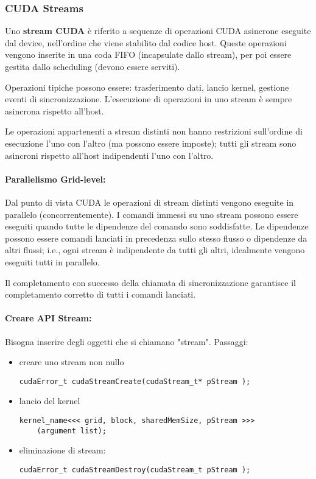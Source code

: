 \subsubsection{CUDA Streams}

Uno \textbf{stream CUDA} è riferito a sequenze di operazioni CUDA asincrone eseguite dal device, nell'ordine che viene stabilito dal codice host. Queste operazioni vengono inserite in una coda FIFO (incapsulate dallo stream), per poi essere gestita dallo scheduling (devono essere serviti). 

Operazioni tipiche possono essere: trasferimento dati, lancio kernel, gestione eventi di sincronizzazione. L'esecuzione di operazioni in uno stream è sempre asincrona rispetto all'host.

Le operazioni appartenenti a stream distinti non hanno restrizioni sull'ordine di esecuzione l'uno con l'altro (ma possono essere imposte); tutti gli stream sono asincroni rispetto all'host indipendenti l'uno con l'altro.

\paragraph{Parallelismo Grid-level:} Dal punto di vista CUDA le operazioni di stream distinti vengono eseguite in parallelo (concorrentemente). I comandi immessi su uno stream possono essere eseguiti quando tutte le dipendenze del comando sono soddisfatte. Le dipendenze possono essere comandi lanciati in precedenza sullo stesso flusso o dipendenze da altri flussi; i.e., ogni stream è indipendente da tutti gli altri, idealmente vengono eseguiti tutti in parallelo.

Il completamento con successo della chiamata di sincronizzazione garantisce il completamento corretto di tutti i comandi lanciati.

\paragraph{Creare API Stream:} Bisogna inserire degli oggetti che si chiamano "stream". Passaggi: 
\begin{itemize}
	\item creare uno stream non nullo
	\begin{verbatim}
cudaError_t cudaStreamCreate(cudaStream_t* pStream );
	\end{verbatim}
	
	\item lancio del kernel
	\begin{verbatim}
kernel_name<<< grid, block, sharedMemSize, pStream >>>
    (argument list);
	\end{verbatim}
	
	\item eliminazione di stream:
	\begin{verbatim}
cudaError_t cudaStreamDestroy(cudaStream_t pStream );
	\end{verbatim}
\end{itemize}

